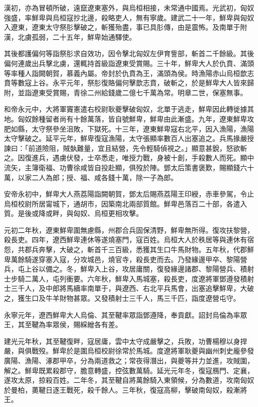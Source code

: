 \begin{pinyinscope}
漢初，亦為冒頓所破，遠竄遼東塞外，與烏桓相接，未常通中國焉。光武初，匈奴強盛，率鮮卑與烏桓寇抄北邊，殺略吏人，無有寧歲。建武二十一年，鮮卑與匈奴入遼東，遼東太守祭肜擊破之，斬獲殆盡，事已具肜傳，由是震怖。及南單于附漢，北虜孤弱，二十五年，鮮卑始通驛使。

其後都護偏何等詣祭肜求自效功，因令擊北匈奴左伊育訾部，斬首二千餘級。其後偏何連歲出兵擊北虜，還輒持首級詣遼東受賞賜。三十年，鮮卑大人於仇賁、滿頭等率種人詣闕朝賀，慕義內屬。帝封於仇賁為王，滿頭為侯。時漁陽赤山烏桓歆志賁等數寇上谷。永平元年，祭肜復賂偏何擊歆志賁，破斬之，於是鮮卑大人皆來歸附，並詣遼東受賞賜，青徐二州給錢歲二億七千萬為常。明章二世，保塞無事。

和帝永元中，大將軍竇憲遣右校尉耿夔擊破匈奴，北單于逃走，鮮卑因此轉徙據其地。匈奴餘種留者尚有十餘萬落，皆自號鮮卑，鮮卑由此漸盛。九年，遼東鮮卑攻肥如縣，太守祭參坐沮敗，下獄死。十三年，遼東鮮卑寇右北平，因入漁陽，漁陽太守擊破之。延平元年，鮮卑復寇漁陽，太守張顯率數百人出塞追之。兵馬掾嚴授諫曰：「前道險阻，賊埶難量，宜且結營，先令輕騎偵視之。」顯意甚銳，怒欲斬之。因復進兵，遇虜伏發，士卒悉走，唯授力戰，身被十創，手殺數人而死。顯中流矢，主簿衛福、功曹徐咸皆自投赴顯，俱歿於陣。鄧太后策書褒歎，賜顯錢六十萬，以家二人為郎；授、福、咸各錢十萬，除一子為郎。

安帝永初中，鮮卑大人燕荔陽詣闕朝賀，鄧太后賜燕荔陽王印綬，赤車參駕，令止烏桓校尉所居甯城下，通胡市，因築南北兩部質館。鮮卑邑落百二十部，各遣入質。是後或降或畔，與匈奴、烏桓更相攻擊。

元初二年秋，遼東鮮卑圍無慮縣，州郡合兵固保清野，鮮卑無所得。復攻扶黎營，殺長吏。四年，遼西鮮卑連休等遂燒塞門，寇百姓。烏桓大人於秩居等與連休有宿怨，共郡兵奔擊，大破之，斬首千三百級，悉獲其生口牛馬財物。五年秋，代郡鮮卑萬餘騎遂穿塞入寇，分攻城邑，燒官寺，殺長吏而去。乃發緣邊甲卒、黎陽營兵，屯上谷以備之。冬，鮮卑入上谷，攻居庸關，復發緣邊諸郡、黎陽營兵、積射士步騎二萬人，屯列衝要。六年秋，鮮卑入馬城塞，殺長吏，度遼將軍鄧遵發積射士三千人，及中郎將馬續率南單于，與遼西、右北平兵馬會，出塞追擊鮮卑，大破之，獲生口及牛羊財物甚眾。又發積射士三千人，馬三千匹，詣度遼營屯守。

永寧元年，遼西鮮卑大人烏倫、其至鞬率眾詣鄧遵降，奉貢獻。詔封烏倫為率眾王，其至鞬為率眾侯，賜綵繒各有差。

建光元年秋，其至鞬復畔，寇居庸，雲中太守成嚴擊之，兵敗，功曹楊穆以身捍嚴，與俱戰歿。鮮卑於是圍烏桓校尉徐常於馬城。度遼將軍耿夔與幽州刺史龐參發廣陽、漁陽、涿郡甲卒，分為兩道救之；常夜得潛出，與夔等并力並進，攻賊圍，解之。鮮卑既累殺郡守，膽意轉盛，控弦數萬騎。延光元年冬，復寇鴈門、定襄，遂攻太原，掠殺百姓。二年冬，其至鞬自將萬餘騎入東領候，分為數道，攻南匈奴於曼柏，薁鞬日逐王戰死，殺千餘人。三年秋，復寇高柳，擊破南匈奴，殺漸將王。


\end{pinyinscope}
